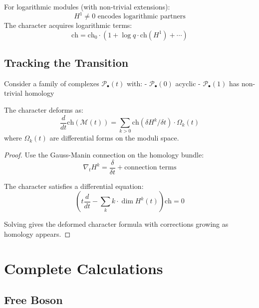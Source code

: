 \begin{example}
For logarithmic modules (with non-trivial extensions):
\[
H^1 \neq 0 \text{ encodes logarithmic partners}
\]
The character acquires logarithmic terms:
\[
\text{ch} = \text{ch}_0 \cdot (1 + \log q \cdot \text{ch}(H^1) + \cdots)
\]
\end{example}

\subsection{Tracking the Transition}

\begin{theorem}
Consider a family of complexes $\mathcal{P}_\bullet(t)$ with:
- $\mathcal{P}_\bullet(0)$ acyclic
- $\mathcal{P}_\bullet(1)$ has non-trivial homology

The character deforms as:
\[
\frac{d}{dt} \text{ch}(\mathcal{M}(t)) = \sum_{k > 0} \text{ch}(\delta H^k/\delta t) \cdot \Omega_k(t)
\]
where $\Omega_k(t)$ are differential forms on the moduli space.
\end{theorem}

\begin{proof}
Use the Gauss-Manin connection on the homology bundle:
\[
\nabla_t H^k = \frac{\delta}{\delta t} + \text{connection terms}
\]

The character satisfies a differential equation:
\[
\left( t\frac{d}{dt} - \sum_k k \cdot \dim H^k(t) \right) \text{ch} = 0
\]

Solving gives the deformed character formula with corrections growing as homology appears.
\end{proof}

\section{Complete Calculations}

\subsection{Free Boson}

